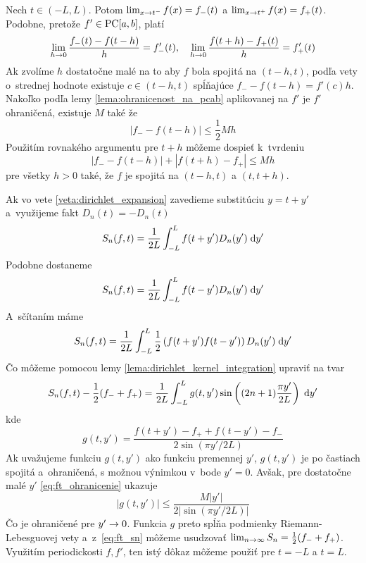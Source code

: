 \begin{dokaz}
    Nech $t \in (-L,L)$. Potom
    $\lim_{x\rightarrow t^-} f(x) = f_-(t)$ a 
    $\lim_{x\rightarrow t^+} f(x) = f_+(t)$.
    Podobne, pretože $f' \in \mbox{PC}[a,b]$, platí
    \begin{equation*}
        \lim_{h\rightarrow 0} \frac{f_-(t) - f(t-h)}{h} = f'_-(t), \quad
        \lim_{h\rightarrow 0} \frac{f(t+h)-f_+(t)}{h} = f'_+(t)
    \end{equation*}
    Ak zvolíme $h$ dostatočne malé na to aby $f$ bola spojitá na
    $(t-h,t)$, podľa vety o~strednej hodnote
    existuje $c \in (t-h,t)$ spĺňajúce 
    $f_- - f(t-h) = f'(c) h$.
    Nakoľko podľa lemy \ref{lema:ohranicenost_na_pcab} aplikovanej na
    $f'$ je $f'$ ohraničená, existuje $M$ také že
    \begin{equation*}
        |f_- - f(t-h)| \le \frac{1}{2} M h
    \end{equation*}
    Použitím rovnakého argumentu pre $t+h$ môžeme dospieť k~tvrdeniu
    \begin{equation}
        |f_- - f(t-h)| + |f(t+h) - f_+| \le Mh
        \label{eq:ft_ohranicenie}
    \end{equation}
    pre všetky $h>0$ také, že $f$ je spojitá na $(t-h,t)$ a $(t,t+h)$.

    Ak vo vete \ref{veta:dirichlet_expansion} zavedieme substitúciu
    $y=t+y'$ a~využijeme fakt $D_n(t)=-D_n(t)$
    \begin{equation*}
        S_n(f,t) = \frac{1}{2L} \int_{-L}^{L} f(t+y') D_n(y') \; \mathrm{d} y'
    \end{equation*}
    Podobne dostaneme
    \begin{equation*}
        S_n(f,t) = \frac{1}{2L} \int_{-L}^{L} f(t-y') D_n(y') \; \mathrm{d} y'
    \end{equation*}
    A~sčítaním máme
    \begin{equation*}
        S_n(f,t) = \frac{1}{2L} \int_{-L}^{L} \frac{1}{2} 
            \left( f(t+y') f(t-y') \right) D_n(y') \; \mathrm{d} y'
    \end{equation*}
    Čo môžeme pomocou lemy \ref{lema:dirichlet_kernel_integration}
    upraviť na tvar
    \begin{equation}
    S_n(f,t) - \frac{1}{2}(f_-+f_+)= \frac{1}{2L} \int_{-L}^{L} 
        g(t,y') \sin\left( (2n+1)\frac{\pi y'}{2L} \right)\; \mathrm{d} y'
        \label{eq:ft_sn}
    \end{equation}
    kde
    \begin{equation*}
        g(t,y') = \frac{f(t+y')-f_+ + f(t-y')-f_-}{2 \sin(\pi y'/ 2L)}
    \end{equation*}
    Ak uvažujeme funkciu $g(t,y')$ ako funkciu premennej $y'$,
    $g(t,y')$ je po častiach spojitá a~ohraničená, s možnou výnimkou
    v~bode $y'=0$. Avšak, pre dostatočne malé $y'$ \eqref{eq:ft_ohranicenie}
    ukazuje
    \begin{equation}
        |g(t,y')|\le \frac{M |y'|}{2|\sin(\pi y'/2L)|}
    \end{equation}
    Čo je ohraničené pre $y'\rightarrow 0$.
    Funkcia $g$ preto spĺňa podmienky Riemann-Lebesguovej vety
    a~z~\eqref{eq:ft_sn} môžeme usudzovať
    $\lim_{n\rightarrow\infty} S_n = \frac{1}{2}(f_- + f_+)$.
    Využitím periodickosti $f,f'$, ten istý dôkaz môžeme použiť pre
    $t=-L$ a $t=L$.
\end{dokaz}

